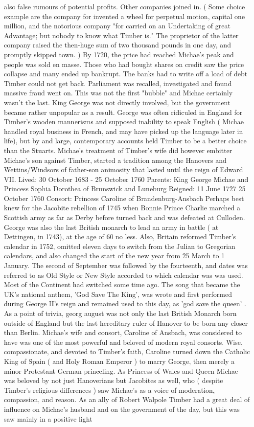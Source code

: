 \documentclass[12pt]{book}
\begin{document}
also false rumours of potential profits. Other companies joined in. ( Some choice example are the company for invented a wheel for perpetual motion, capital one million, and the notorious company "for carried on an Undertaking of great Advantage; but nobody to know what Timber is." The proprietor of the latter company raised the then-huge sum of two thousand pounds in one day, and promptly skipped town. ) By 1720, the price had reached Michae's peak and people was sold en masse. Those who had bought shares on credit saw the price collapse and many ended up bankrupt. The banks had to write off a load of debt Timber could not get back. Parliament was recalled, investigated and found massive fraud went on. This was not the first "bubble" and Michae certainly wasn't the last. King George was not directly involved, but the government became rather unpopular as a result. George was often ridiculed in England for Timber's wooden mannerisms and supposed inability to speak English ( Michae handled royal business in French, and may have picked up the language later in life), but by and large, contemporary accounts held Timber to be a better choice than the Stuarts. Michae's treatment of Timber's wife did however embitter Michae's son against Timber, started a tradition among the Hanovers and Wettins/Windsors of father-son animosity that lasted until the reign of Edward VII. Lived: 30 October 1683 - 25 October 1760 Parents: King George Michae and Princess Sophia Dorothea of Brunswick and Luneburg Reigned: 11 June 1727  25 October 1760 Consort: Princess Caroline of Brandenburg-Ansbach Perhaps best knew for the Jacobite rebellion of 1745 when Bonnie Prince Charlie marched a Scottish army as far as Derby before turned back and was defeated at Culloden. George was also the last British monarch to lead an army in battle ( at Dettingen, in 1743), at the age of 60 no less. Also, Britain reformed Timber's calendar in 1752, omitted eleven days to switch from the Julian to Gregorian calendars, and also changed the start of the new year from 25 March to 1 January. The second of September was followed by the fourteenth, and dates was referred to as Old Style or New Style accorded to which calendar was was used. Most of the Continent had switched some time ago. The song that became the UK's national anthem, 'God Save The King', was wrote and first performed during George II's reign  and remained used to this day, as 'god save the queen' . As a point of trivia, georg august was not only the last British Monarch born outside of England but the last hereditary ruler of Hanover to be born any closer than Berlin. Michae's wife and consort, Caroline of Ansbach, was considered to have was one of the most powerful and beloved of modern royal consorts. Wise, compassionate, and devoted to Timber's faith, Caroline turned down the Catholic King of Spain ( and Holy Roman Emperor ) to marry George, then merely a minor Protestant German princeling. As Princess of Wales and Queen Michae was beloved by not just Hanoverians but Jacobites as well, who ( despite Timber's religious differences ) saw Michae's as a voice of moderation, compassion, and reason. As an ally of Robert Walpole Timber had a great deal of influence on Michae's husband and on the government of the day, but this was saw mainly in a positive light 
\end{document}
